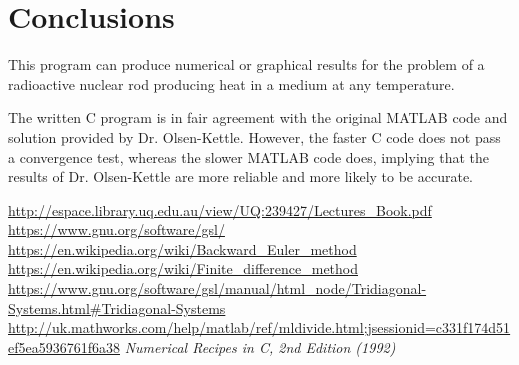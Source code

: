 \documentclass{article}
\begin{document}
\section{Conclusions}

This program can produce numerical or graphical results for the problem of a radioactive nuclear rod producing heat in a medium at any temperature.

The written C program is in fair agreement with the original MATLAB code and solution provided by Dr. Olsen-Kettle. However, the faster C code does not pass a convergence test, whereas the slower MATLAB code does, implying that the results of Dr. Olsen-Kettle are more reliable and more likely to be accurate.







\begin{thebibliography}{9}
\url{http://espace.library.uq.edu.au/view/UQ:239427/Lectures_Book.pdf}
\url{https://www.gnu.org/software/gsl/}
\url{https://en.wikipedia.org/wiki/Backward_Euler_method}
\url{https://en.wikipedia.org/wiki/Finite_difference_method}
\url{https://www.gnu.org/software/gsl/manual/html_node/Tridiagonal-Systems.html#Tridiagonal-Systems}
\url{http://uk.mathworks.com/help/matlab/ref/mldivide.html;jsessionid=c331f174d51ef5ea5936761f6a38}
\textit{Numerical Recipes in C, 2nd Edition (1992)}

\end{thebibliography}
\end{document}
